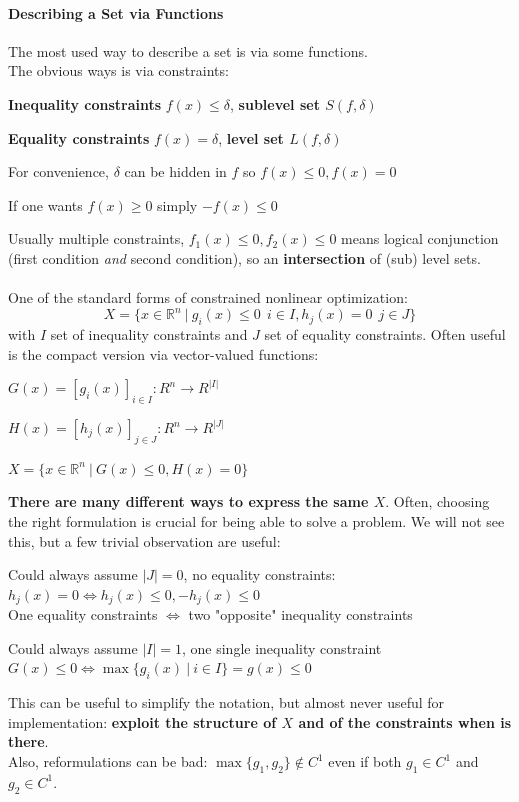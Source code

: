 \documentclass[10pt]{report}
\begin{document}
\paragraph{Describing a Set via Functions} The most used way to describe a set is via some functions.\\
The obvious ways is via constraints:
\begin{list}{}{}
	\item \textbf{Inequality constraints} $f(x)\leq\delta$, \textbf{sublevel set $S(f,\delta)$}
	\item \textbf{Equality constraints} $f(x)=\delta$, \textbf{level set $L(f,\delta)$}
	\item For convenience, $\delta$ can be hidden in $f$ so $f(x)\leq0,f(x)=0$
	\item If one wants $f(x)\geq 0$ simply $-f(x)\leq 0$
\end{list}
Usually multiple constraints, $f_1(x)\leq 0, f_2(x)\leq 0$ means logical conjunction (first condition \textit{and} second condition), so an \textbf{intersection} of (sub) level sets.\\\\
One of the standard forms of constrained nonlinear optimization:
$$X=\{x\in \mathbb{R}^n\:|\:g_i(x)\leq 0\:\:i\in I, h_j(x)=0\:\:j\in J\}$$
with $I$ set of inequality constraints and $J$ set of equality constraints. Often useful is the compact version via vector-valued functions:
\begin{list}{}{}
	\item $G(x) = [g_i(x)]_{i\in I} : R^n\rightarrow R^{|I|}$
	\item $H(x) = [h_j(x)]_{j\in J} : R^n\rightarrow R^{|J|}$
	\item $X=\{x\in \mathbb{R}^n\:|\:G(x)\leq 0, H(x) = 0\}$
\end{list}
\textbf{There are many different ways to express the same $X$}. Often, choosing the right formulation is crucial for being able to solve a problem. We will not see this, but a few trivial observation are useful:
\begin{list}{}{}
	\item Could always assume $|J|=0$, no equality constraints: $h_j(x) = 0\Leftrightarrow h_j(x)\leq 0, -h_j(x)\leq 0$\\
	One equality constraints $\Leftrightarrow$ two "opposite" inequality constraints
	\item Could always assume $|I|=1$, one single inequality constraint\\
	$G(x)\leq 0\Leftrightarrow \max\{g_i(x)\:|\:i\in I\} = g(x)\leq 0$
\end{list}
This can be useful to simplify the notation, but almost never useful for implementation: \textbf{exploit the structure of $X$ and of the constraints when is there}.\\
Also, reformulations can be bad: $\max\{g_1,g_2\}\not\in C^1$ even if both $g_1\in C^1$ and $g_2\in C^1$.
\end{document}
